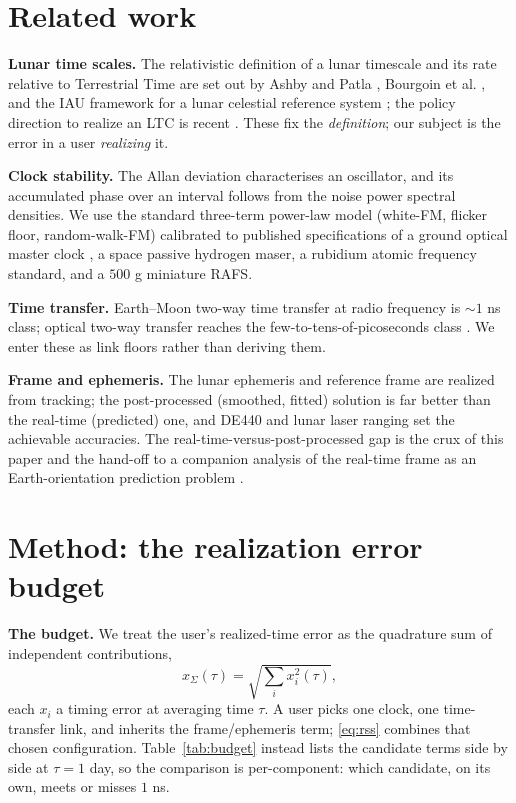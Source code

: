 \documentclass[conference]{IEEEtran}
\begin{document}
\section{Related work}
\textbf{Lunar time scales.} The relativistic definition of a lunar timescale and its
rate relative to Terrestrial Time are set out by Ashby and Patla \cite{ashby2024},
Bourgoin et al. \cite{bourgoin2026}, and the IAU framework for a lunar celestial
reference system \cite{iaulctime}; the policy direction to realize an LTC is recent
\cite{ltcpolicy}. These fix the \emph{definition}; our subject is the error in a
user \emph{realizing} it.

\textbf{Clock stability.} The Allan deviation \cite{allan,riley} characterises an
oscillator, and its accumulated phase over an interval follows from the noise power
spectral densities. We use the standard three-term power-law model (white-FM,
flicker floor, random-walk-FM) calibrated to published specifications of a ground
optical master clock \cite{origlia2015}, a space passive hydrogen maser, a rubidium
atomic frequency standard, and a $500$ g miniature RAFS.

\textbf{Time transfer.} Earth--Moon two-way time transfer at radio frequency is
$\sim$$1$ ns class; optical two-way transfer reaches the few-to-tens-of-picoseconds
class \cite{twoway}. We enter these as link floors rather than deriving them.

\textbf{Frame and ephemeris.} The lunar ephemeris and reference frame are realized
from tracking; the post-processed (smoothed, fitted) solution is far better than the
real-time (predicted) one, and DE440 \cite{de440} and lunar laser ranging set the
achievable accuracies. The real-time-versus-post-processed gap is the crux of this
paper and the hand-off to a companion analysis of the real-time frame as an
Earth-orientation prediction problem \cite{baweja2026eop}.

\section{Method: the realization error budget}
\label{sec:method}
\textbf{The budget.} We treat the user's realized-time error as the quadrature sum
of independent contributions,
\begin{equation}
x_\Sigma(\tau) = \sqrt{\textstyle\sum_i x_i^2(\tau)},
\label{eq:rss}
\end{equation}
each $x_i$ a timing error at averaging time $\tau$. A user picks one clock, one
time-transfer link, and inherits the frame/ephemeris term; \eqref{eq:rss} combines
that chosen configuration. Table~\ref{tab:budget} instead lists the candidate terms
side by side at $\tau=1$ day, so the comparison is per-component: which candidate, on
its own, meets or misses $1$ ns.
\end{document}
